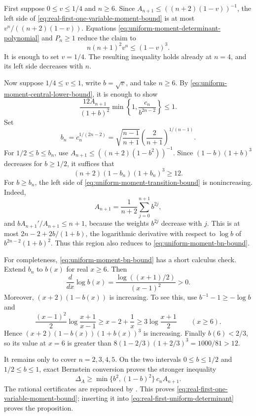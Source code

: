 \documentclass[11pt]{article}
\theoremstyle{remark}
\begin{document}
First suppose $0\leq v\leq1/4$ and $n\geq6$.  Since
$A_{n+1}\leq((n+2)(1-v))^{-1}$, the left side of
\eqref{eq:real-first-one-variable-moment-bound} is at most
$v^n/((n+2)(1-v))$.  Equations
\eqref{eq:uniform-moment-determinant-polynomial} and $P_n\geq1$ reduce the
claim to
\[
 n(n+1)^2v^n\leq(1-v)^3.
\]
It is enough to set $v=1/4$.  The resulting inequality holds already at
$n=4$, and its left side decreases with $n$.

Now suppose $1/4\leq v\leq1$, write $b=\sqrt v$, and take $n\geq6$.
By \eqref{eq:uniform-moment-central-lower-bound}, it is enough to show
\begin{equation}\label{eq:uniform-moment-transition-bound}
 \frac{12A_{n+1}}{(1+b)^2}
 \min\left\{1,\frac{c_n}{b^{2n-2}}\right\}\leq1.
\end{equation}
Set
\[
 b_n=c_n^{1/(2n-2)}
 =\sqrt{\frac{n-1}{n+1}}
   \left(\frac2{n+1}\right)^{1/(n-1)}.
\]
For $1/2\leq b\leq b_n$, use
$A_{n+1}\leq((n+2)(1-b^2))^{-1}$.  Since
$(1-b)(1+b)^3$ decreases for $b\geq1/2$, it suffices that
\begin{equation}\label{eq:uniform-moment-bn-bound}
 (n+2)(1-b_n)(1+b_n)^3\geq12.
\end{equation}
For $b\geq b_n$, the left side of
\eqref{eq:uniform-moment-transition-bound} is nonincreasing.  Indeed,
\[
 A_{n+1}=\frac1{n+2}\sum_{j=0}^{n+1}b^{2j},
\]
and $bA_{n+1}'/A_{n+1}\leq n+1$, because the weights $b^{2j}$ decrease
with $j$.  This is at most
$2n-2+2b/(1+b)$, the logarithmic derivative with respect to $\log b$ of
$b^{2n-2}(1+b)^2$.  Thus this region also reduces to
\eqref{eq:uniform-moment-bn-bound}.

For completeness, \eqref{eq:uniform-moment-bn-bound} has a short calculus
check.  Extend $b_n$ to $b(x)$ for real $x\geq6$.  Then
\[
 \frac{d}{dx}\log b(x)
 =\frac{\log((x+1)/2)}{(x-1)^2}>0.
\]
Moreover, $(x+2)(1-b(x))$ is increasing.  To see this, use
$b^{-1}-1\geq-\log b$ and
\[
 \frac{(x-1)^2}{2}\log\frac{x+1}{x-1}
 \geq x-2+\frac1x
 \geq3\log\frac{x+1}{2}\qquad(x\geq6).
\]
Hence $(x+2)(1-b(x))(1+b(x))^3$ is increasing.  Finally
$b(6)<2/3$, so its value at $x=6$ is greater than
$8(1-2/3)(1+2/3)^3=1000/81>12$.

It remains only to cover $n=2,3,4,5$.  On the two intervals
$0\leq b\leq1/2$ and $1/2\leq b\leq1$, exact Bernstein conversion proves
the stronger inequality
\[
 \Delta_A\geq \min\{b^2,(1-b)^2\}\,c_nA_{n+1}.
\]
The rational certificates are reproduced by
.  This proves
\eqref{eq:real-first-one-variable-moment-bound}; inserting it into
\eqref{eq:real-first-uniform-determinant} proves the proposition.
\end{document}
